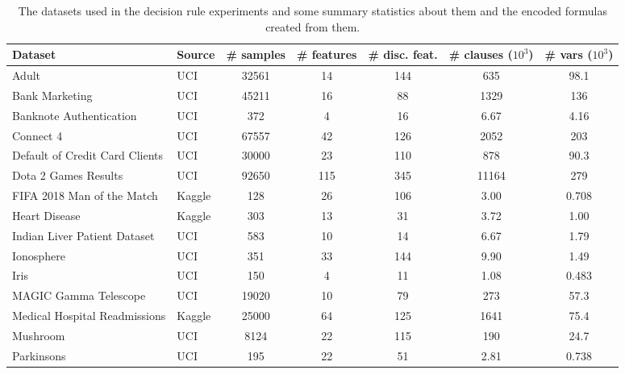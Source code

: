 \begin{sidewaystable}
    \centering
    \caption{The datasets used in the decision rule experiments and some summary statistics about them and the encoded formulas created from them.}\label{tab:datasets}
    {\small
    \begin{tabular}{@{}llS[table-format=6.0]S[table-format=3.0]S[table-format=4.0]S[table-format=5.2]S[table-format=3.3]@{}}
        \toprule
        Dataset & Source & {\# samples} & {\# features} & {\# disc. feat.} & {\# clauses ($10^3$)} & {\# vars ($10^3$)} \\
        \midrule
        Adult                                & UCI    &  32561 &  14 &  144 &   635    &   98.1 \\
        Bank Marketing                       & UCI    &  45211 &  16 &   88 &  1329    &  136 \\
        Banknote Authentication              & UCI    &    372 &   4 &   16 &     6.67 &    4.16 \\
        Connect 4                            & UCI    &  67557 &  42 &  126 &  2052    &  203 \\
        Default of Credit Card Clients       & UCI    &  30000 &  23 &  110 &   878    &   90.3 \\
        Dota 2 Games Results                 & UCI    &  92650 & 115 &  345 & 11164    &  279 \\
        FIFA 2018 Man of the Match           & Kaggle &    128 &  26 &  106 &     3.00 &    0.708 \\
        Heart Disease                        & Kaggle &    303 &  13 &   31 &     3.72 &    1.00 \\
        Indian Liver Patient Dataset         & UCI    &    583 &  10 &   14 &     6.67 &    1.79 \\
        Ionosphere                           & UCI    &    351 &  33 &  144 &     9.90 &    1.49 \\
        Iris                                 & UCI    &    150 &   4 &   11 &     1.08 &    0.483 \\
        MAGIC Gamma Telescope                & UCI    &  19020 &  10 &   79 &   273    &   57.3 \\
        Medical Hospital Readmissions        & Kaggle &  25000 &  64 &  125 &  1641    &   75.4 \\
        Mushroom                             & UCI    &   8124 &  22 &  115 &   190    &   24.7 \\
        Parkinsons                           & UCI    &    195 &  22 &   51 &     2.81 &    0.738 \\

\end{tabular}}
\end{sidewaystable}
